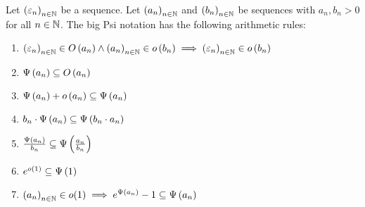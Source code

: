 \begin{theorem} \label{thm:bigpsi:rules}
  Let $\left({\varepsilon_n}\right)_{{n}\in\mathbb N}$ be a sequence. Let $\left({a_n}\right)_{{n}\in\mathbb N}$ and $\left({b_n}\right)_{{n}\in\mathbb N}$ be sequences with $a_n,b_n > 0$ for all $n\in\mathbb N$. The big Psi notation has the following arithmetic rules:

  \begin{enumerate}
    \item $\left({\varepsilon_n}\right)_{{n}\in\mathbb N} \in O\left( {a_n} \right) \land \left({a_n}\right)_{{n}\in\mathbb N} \in o\left( {b_n} \right) \implies \left({\varepsilon_n}\right)_{{n}\in\mathbb N} \in o\left( {b_n} \right)$
    \item $\Psi\left( {a_n} \right) \subseteq O\left( {a_n} \right)$
    \item $\Psi\left( {a_n} \right) + o\left( {a_n} \right) \subseteq \Psi\left( {a_n} \right)$
    \item $b_n \cdot \Psi\left( {a_n} \right) \subseteq \Psi\left( {b_n \cdot a_n} \right)$
    \item $\frac{\Psi\left( {a_n} \right)}{b_n} \subseteq \Psi\left( {\frac{a_n}{b_n}} \right)$
    \item $e^{o\left( {1} \right)} \subseteq \Psi\left( {1} \right)$
    \item $\left({a_n}\right)_{{n}\in\mathbb N} \in o(1) \implies e^{\Psi\left( {a_n} \right)}-1 \subseteq \Psi\left( {a_n} \right)$
  \end{enumerate}
\end{theorem}
